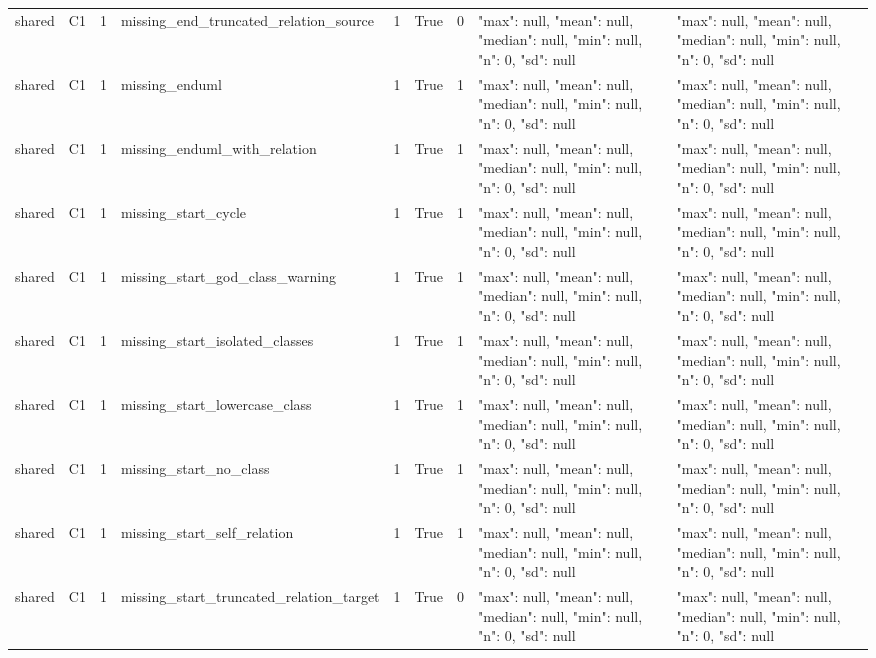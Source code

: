 \begin{tabular}{lllllllll}
shared & C1 & 1 & missing\_end\_truncated\_relation\_source & 1 & True & 0 & {"max": null, "mean": null, "median": null, "min": null, "n": 0, "sd": null} & {"max": null, "mean": null, "median": null, "min": null, "n": 0, "sd": null} \\
shared & C1 & 1 & missing\_enduml & 1 & True & 1 & {"max": null, "mean": null, "median": null, "min": null, "n": 0, "sd": null} & {"max": null, "mean": null, "median": null, "min": null, "n": 0, "sd": null} \\
shared & C1 & 1 & missing\_enduml\_with\_relation & 1 & True & 1 & {"max": null, "mean": null, "median": null, "min": null, "n": 0, "sd": null} & {"max": null, "mean": null, "median": null, "min": null, "n": 0, "sd": null} \\
shared & C1 & 1 & missing\_start\_cycle & 1 & True & 1 & {"max": null, "mean": null, "median": null, "min": null, "n": 0, "sd": null} & {"max": null, "mean": null, "median": null, "min": null, "n": 0, "sd": null} \\
shared & C1 & 1 & missing\_start\_god\_class\_warning & 1 & True & 1 & {"max": null, "mean": null, "median": null, "min": null, "n": 0, "sd": null} & {"max": null, "mean": null, "median": null, "min": null, "n": 0, "sd": null} \\
shared & C1 & 1 & missing\_start\_isolated\_classes & 1 & True & 1 & {"max": null, "mean": null, "median": null, "min": null, "n": 0, "sd": null} & {"max": null, "mean": null, "median": null, "min": null, "n": 0, "sd": null} \\
shared & C1 & 1 & missing\_start\_lowercase\_class & 1 & True & 1 & {"max": null, "mean": null, "median": null, "min": null, "n": 0, "sd": null} & {"max": null, "mean": null, "median": null, "min": null, "n": 0, "sd": null} \\
shared & C1 & 1 & missing\_start\_no\_class & 1 & True & 1 & {"max": null, "mean": null, "median": null, "min": null, "n": 0, "sd": null} & {"max": null, "mean": null, "median": null, "min": null, "n": 0, "sd": null} \\
shared & C1 & 1 & missing\_start\_self\_relation & 1 & True & 1 & {"max": null, "mean": null, "median": null, "min": null, "n": 0, "sd": null} & {"max": null, "mean": null, "median": null, "min": null, "n": 0, "sd": null} \\
shared & C1 & 1 & missing\_start\_truncated\_relation\_target & 1 & True & 0 & {"max": null, "mean": null, "median": null, "min": null, "n": 0, "sd": null} & {"max": null, "mean": null, "median": null, "min": null, "n": 0, "sd": null} \\

\end{tabular}
